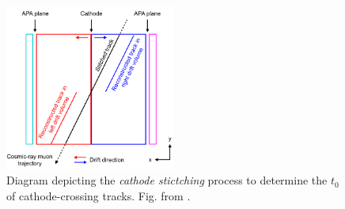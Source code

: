 \begin{figure}[htbp!] 
\centering    
\includegraphics[width=0.5\textwidth]{cosmic_stitch}
\caption[cosmic_stitch]{
	Diagram depicting the \textit{cathode stictching} process to determine the $t_{0}$ of cathode-crossing tracks.
	Fig. from \cite{pandora_protodune}.
}
\label{fig:cosmic_stitch}
\end{figure}

